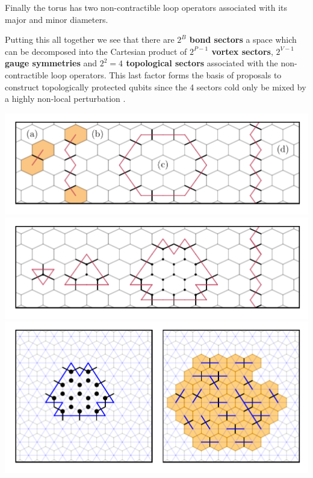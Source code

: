 Finally the torus has two non-contractible loop operators associated with its major and minor diameters.

Putting this all together we see that there are \textbf{\(2^B\) bond sectors} a space which can be decomposed into the Cartesian product of \textbf{\(2^{P-1}\) vortex sectors}, \textbf{\(2^{V-1}\) gauge symmetries} and \textbf{\(2^2 = 4\) topological sectors} associated with the non-contractible loop operators. This last factor forms the basis of proposals to construct topologically protected qubits since the 4 sectors cold only be mixed by a highly non-local perturbation \textcite{kitaevFaulttolerantQuantumComputation2003}.

\includegraphics[width=1\textwidth,height=\textheight]{figure_code/amk_chapter/intro/types_of_dual_loops/types_of_dual_loops.pdf} \includegraphics[width=1\textwidth,height=\textheight]{figure_code/amk_chapter/intro/gauge_symmetries/gauge_symmetries.pdf} \includegraphics[width=1\textwidth,height=\textheight]{figure_code/amk_chapter/flood_fill/flood_fill.pdf} 